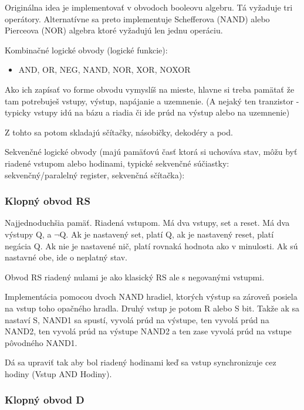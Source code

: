 \documentclass[a4paper,10pt]{article}
\begin{document}
\begin{multicols}{2}
		Originálna idea je implementovať v obvodoch booleovu algebru. Tá vyžaduje tri operátory. Alternatívne sa preto implementuje Schefferova (NAND) alebo Pierceova (NOR) algebra ktoré vyžadujú len jednu operáciu.
		
		Kombinačné logické obvody (logické funkcie):
		
		\begin{itemize}
			\item AND, OR, NEG, NAND, NOR, XOR, NOXOR
		\end{itemize}
		
		Ako ich zapísať vo forme obvodu vymyslíš na mieste, hlavne si treba pamätať že tam potrebuješ vstupy, výstup, napájanie a uzemnenie. (A nejaký ten tranzistor - typicky vstupy idú na bázu a riadia či ide prúd na výstup alebo na uzemnenie)
		
		Z tohto sa potom skladajú sčítačky, násobičky, dekodéry a pod.
		
		Sekvenčné logické obvody (majú pamäťovú časť ktorá si uchováva stav, môžu byť riadené vstupom alebo hodinami, typické sekvenčné súčiastky: sekvenčný/paralelný register, sekvenčná sčítačka):
			
		\subsubsection{Klopný obvod RS}
		
			Najjednoduchšia pamäť. Riadená vstupom. Má dva vstupy, set a reset. Má dva výstupy Q, a $\neg$Q. Ak je nastavený set, platí Q, ak je nastavený reset, platí negácia Q. Ak nie je nastavené nič, platí rovnaká hodnota ako v minulosti. Ak sú nastavné obe, ide o neplatný stav. 
			
			Obvod RS riadený nulami je ako klasický RS ale s negovanými vstupmi.
			
			Implementácia pomocou dvoch NAND hradiel, ktorých výstup sa zároveň posiela na vstup toho opačného hradla. Druhý vstup je potom R alebo S bit. Takže ak sa nastaví S, NAND1 sa spustí, vyvolá prúd na výstupe, ten vyvolá prúd na NAND2, ten vyvolá prúd na výstupe NAND2 a ten zase vyvolá prúd na vstupe pôvodného NAND1.
			
			Dá sa upraviť tak aby bol riadený hodinami keď sa vstup synchronizuje cez hodiny (Vstup AND Hodiny).
			
		\subsubsection{Klopný obvod D}
		

\end{multicols}
\end{document}
